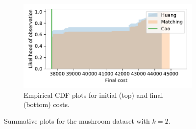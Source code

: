 \documentclass[11pt]{article}
\begin{document}
\begin{figure}
\begin{subfigure}{.5\textwidth}
        \includegraphics[width=\linewidth]{Fig6b2.pdf}
        \caption{Empirical CDF plots for initial (top) and final (bottom)
                 costs.}
    \end{subfigure}
    \caption{Summative plots for the mushroom dataset with \(k=2\).}%
    \label{fig:mushroom_nclasses}
\end{figure}
\end{document}
